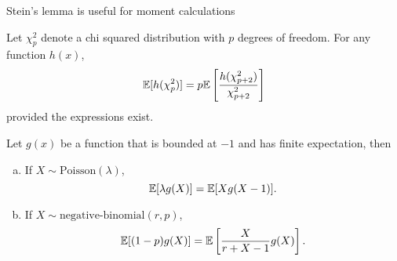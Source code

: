 \begin{remark}
    Stein's lemma is useful for moment calculations
\end{remark}

\begin{theorem}
    Let $\chi^2_p$ denote a chi squared distribution with $p$ degrees of freedom. For any function $h(x)$,
    \[
        \mathbb{E}{}[h(\chi^2_p)] = p \mathbb{E}{}\left[\frac{h(\chi_{p+2}^2)}{\chi_{p+2}^2}\right]
    \]
    provided the expressions exist.
\end{theorem}

\begin{theorem}
    Let $g(x)$ be a function that is bounded at $-1$ and has finite expectation, then
    \begin{enumerate}[a.]
        \item If $X \sim \text{Poisson}(\lambda)$,
            \[
                \mathbb{E}{}[\lambda g(X)] = \mathbb{E}{}[Xg(X-1)].
            \]
        \item If $X\sim \text{negative-binomial}(r, p)$,
            \[
                \mathbb{E}{}[(1-p)g(X)] = \mathbb{E}{}\left[ \frac{X}{r + X - 1}g(X) \right].
            \]
    \end{enumerate}
\end{theorem}






